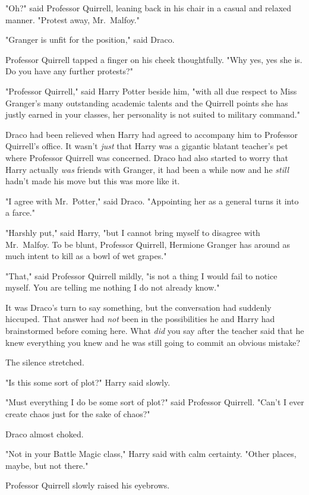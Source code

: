"Oh?" said Professor Quirrell, leaning back in his chair in a casual and
relaxed manner. "Protest away, Mr.~Malfoy."

"Granger is unfit for the position," said Draco.

Professor Quirrell tapped a finger on his cheek thoughtfully. "Why yes, yes she
is. Do you have any further protests?"

"Professor Quirrell," said Harry Potter beside him, "with all due respect to
Miss Granger's many outstanding academic talents and the Quirrell points she
has justly earned in your classes, her personality is not suited to military
command."

Draco had been relieved when Harry had agreed to accompany him to Professor
Quirrell's office. It wasn't \emph{just} that Harry was a gigantic blatant
teacher's pet where Professor Quirrell was concerned. Draco had also started to
worry that Harry actually \emph{was} friends with Granger, it had been a while
now and he \emph{still} hadn't made his move{\el} but this was more like it.

"I agree with Mr.~Potter," said Draco. "Appointing her as a general turns it
into a farce."

"Harshly put," said Harry, "but I cannot bring myself to disagree with
Mr.~Malfoy. To be blunt, Professor Quirrell, Hermione Granger has around as
much intent to kill as a bowl of wet grapes."

"That," said Professor Quirrell mildly, "is not a thing I would fail to notice
myself. You are telling me nothing I do not already know."

It was Draco's turn to say something, but the conversation had suddenly
hiccuped. That answer had \emph{not} been in the possibilities he and Harry
had brainstormed before coming here. What \emph{did} you say after the teacher
said that he knew everything you knew and he was still going to commit an
obvious mistake?

The silence stretched.

"Is this some sort of plot?" Harry said slowly.

"Must everything I do be some sort of plot?" said Professor Quirrell. "Can't I
ever create chaos just for the sake of chaos?"

Draco almost choked.

"Not in your Battle Magic class," Harry said with calm certainty. "Other
places, maybe, but not there."

Professor Quirrell slowly raised his eyebrows.

